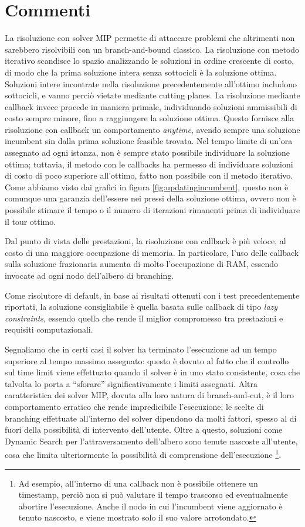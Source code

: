 \section{Commenti}
La risoluzione con solver MIP permette di attaccare problemi che altrimenti non sarebbero risolvibili con un branch-and-bound classico. La risoluzione con metodo iterativo scandisce lo spazio analizzando le soluzioni in ordine crescente di costo, di modo che la prima soluzione intera senza sottocicli è la soluzione ottima. Soluzioni intere incontrate nella risoluzione precedentemente all'ottimo includono sottocicli, e vanno perciò vietate mediante cutting planes. La risoluzione mediante callback invece procede in maniera primale, individuando soluzioni ammissibili di costo sempre minore, fino a raggiungere la soluzione ottima.  Questo fornisce alla risoluzione con callback un comportamento \textit{anytime}, avendo sempre una soluzione incumbent sin dalla prima soluzione feasible trovata. Nel tempo limite di un'ora assegnato ad ogni istanza, non è sempre stato possibile individuare la soluzione ottima; tuttavia, il metodo con le callbacks ha permesso di individuare soluzioni di costo di poco superiore all'ottimo, fatto non possibile con il metodo iterativo. Come abbiamo visto dai grafici in figura \ref{fig:updatingincumbent}, questo non è comunque una garanzia dell'essere nei pressi della soluzione ottima, ovvero non è possibile stimare il tempo o il numero di iterazioni rimanenti prima di individuare il tour ottimo.

Dal punto di vista delle prestazioni, la risoluzione con callback è più veloce, al costo di una maggiore occupazione di memoria. In particolare, l'uso delle callback sulla soluzione frazionaria aumenta di molto l'occupazione di RAM, essendo invocate ad ogni nodo dell'albero di branching. 

Come risolutore di default, in base ai risultati ottenuti con i test precedentemente riportati, la soluzione consigliabile è quella basata sulle callback di tipo \textit{lazy constraints}, essendo quella che rende il miglior compromesso tra prestazioni e requisiti computazionali.

Segnaliamo che in certi casi il solver ha terminato l'esecuzione ad un tempo superiore al tempo massimo assegnato: questo è dovuto al fatto che il controllo sul time limit viene effettuato quando il solver è in uno stato consistente, cosa che talvolta lo porta a ``sforare'' significativamente i limiti assegnati. Altra caratteristica dei solver MIP, dovuta alla loro natura di branch-and-cut, è il loro comportamento erratico che rende impredicibile l'esecuzione; le scelte di branching effettuate all'interno del solver dipendono da molti fattori, spesso al di fuori della possibilità di intervento dell'utente. Oltre a questo, soluzioni come Dynamic Search per l'attraversamento dell'albero sono tenute nascoste all'utente, cosa che limita ulteriormente la possibilità di comprensione dell'esecuzione \footnote{Ad esempio, all'interno di una callback non è possibile ottenere un timestamp, perciò non si può valutare il tempo trascorso ed eventualmente abortire l'esecuzione. Anche il nodo in cui l'incumbent viene aggiornato è tenuto nascosto, e viene mostrato solo il suo valore arrotondato.}.
